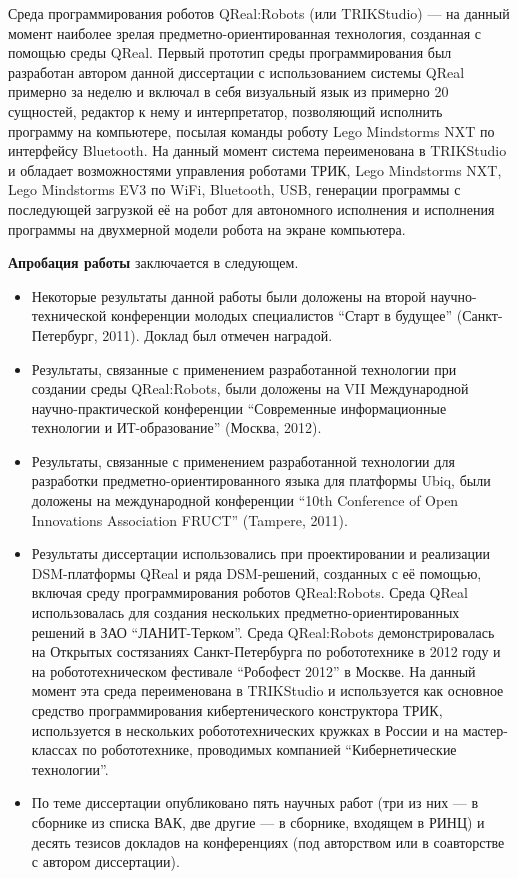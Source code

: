 Среда программирования роботов QReal:Robots (или TRIKStudio) --- на данный момент наиболее зрелая 
предметно-ориентированная технология, созданная с помощью среды QReal. 
Первый прототип среды программирования был разработан автором данной диссертации
с использованием системы QReal примерно за неделю и включал в себя визуальный 
язык из примерно 20 сущностей, редактор к нему и интерпретатор, позволяющий 
исполнить программу на компьютере, посылая команды роботу Lego Mindstorms NXT по интерфейсу 
Bluetooth. На данный момент система переименована в TRIKStudio и обладает возможностями управления роботами 
ТРИК, Lego Mindstorms NXT, Lego Mindstorms EV3 по WiFi, Bluetooth, USB, генерации программы с 
последующей загрузкой её на робот для автономного исполнения и исполнения 
программы на двухмерной модели робота на экране компьютера.

\textbf{Апробация работы} заключается в следующем.
\begin{itemize}
	\item Некоторые результаты данной работы были доложены на второй 
		научно-технической конференции молодых специалистов "`Старт в будущее"' 
		(Санкт-Петербург, 2011). Доклад был отмечен наградой.
	\item Результаты, связанные с применением разработанной технологии при 
		создании среды QReal:Robots, были доложены на VII Международной 
		научно-практической конференции "`Современные информационные технологии 
		и ИТ-образование"' (Москва, 2012).
	\item Результаты, связанные с применением разработанной технологии для 
		разработки предметно-ориентированного языка для платформы Ubiq, были доложены 
		на международной конференции "`10th Conference of Open Innovations 
		Association FRUCT"' (Tampere, 2011).
	\item Результаты диссертации использовались при проектировании и реализации 
		DSM-платформы QReal и ряда DSM-решений, созданных с её помощью, включая 
		среду программирования роботов QReal:Robots. Среда QReal использовалась для 
		создания нескольких предметно-ориентированных решений в ЗАО “ЛАНИТ-Терком”. 
		Среда QReal:Robots демонстрировалась на Открытых состязаниях 
		Санкт-Петербурга по робототехнике в 2012 году и на робототехническом 
		фестивале "`Робофест 2012"' в Москве. На данный момент эта среда переименована в 
		TRIKStudio и используется как основное средство программирования 
		кибертенического конструктора ТРИК, используется в нескольких робототехнических 
		кружках в России и на мастер-классах по робототехнике, проводимых компанией "`Кибернетические технологии"'.
	\item По теме диссертации опубликовано пять научных работ (три из них ---
		в сборнике из списка ВАК, две другие --- в сборнике, входящем в РИНЦ) и 
		десять тезисов докладов на конференциях (под авторством или в соавторстве с 
		автором диссертации).
\end{itemize}

